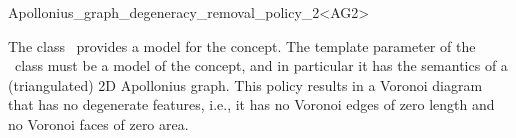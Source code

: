 

\begin{ccRefClass}{Apollonius_graph_degeneracy_removal_policy_2<AG2>}


\ccDefinition

The class \ccRefName\ provides a model for the 
concept. The template parameter of the \ccRefName\ class must be a
model of the  concept, and in particular it has
the semantics of a (triangulated) 2D Apollonius graph. This policy
results in a Voronoi diagram that has no degenerate features,
i.e., it has no Voronoi edges of zero length and no Voronoi faces of
zero area.



\ccIsModel
{}

\ccTypes
{}

\ccSeeAlso
{}\\
\\
\\
\\
\\
\end{ccRefClass}



